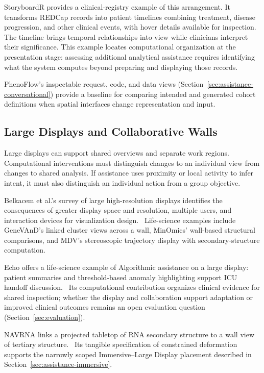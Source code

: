 StoryboardR provides a clinical-registry example of this arrangement. It transforms REDCap records into patient timelines combining treatment, disease progression, and other clinical events, with hover details available for inspection.~\cite{MillerShalhout2023StoryboardR} The timeline brings temporal relationships into view while clinicians interpret their significance. This example locates computational organization at the presentation stage: assessing additional analytical assistance requires identifying what the system computes beyond preparing and displaying those records.

PhenoFlow's inspectable request, code, and data views (Section~\ref{sec:assistance-conversational}) provide a baseline for comparing intended and generated cohort definitions when spatial interfaces change representation and input.

\subsection{Large Displays and Collaborative Walls}
\label{sec:modality-walls}

Large displays can support shared overviews and separate work regions. Computational interventions must distinguish changes to an individual view from changes to shared analysis. If assistance uses proximity or local activity to infer intent, it must also distinguish an individual action from a group objective.

Belkacem et al.'s survey of large high-resolution displays identifies the consequences of greater display space and resolution, multiple users, and interaction devices for visualization design.~\cite{belkacem2024large} Life-science examples include GeneVAnD's linked cluster views across a wall, MinOmics' wall-based structural comparisons, and MDV's stereoscopic trajectory display with secondary-structure computation.~\cite{ExpandedE06,ExpandedE07,ExpandedE08}

Echo offers a life-science example of Algorithmic assistance on a large display: patient summaries and threshold-based anomaly highlighting support ICU handoff discussion.~\cite{MapEcho} Its computational contribution organizes clinical evidence for shared inspection; whether the display and collaboration support adaptation or improved clinical outcomes remains an open evaluation question (Section~\ref{sec:evaluation}).

NAVRNA links a projected tabletop of RNA secondary structure to a wall view of tertiary structure.~\cite{NewNAVRNA2006} Its tangible specification of constrained deformation supports the narrowly scoped Immersive--Large Display placement described in Section~\ref{sec:assistance-immersive}.

